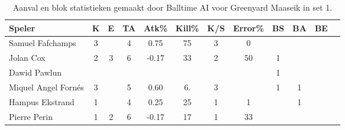 \begin{table}[ht!]
  \centering
  \scriptsize
  \begin{tabular}{|l|c|c|c|c|c|c|c|c|c|c|c|} \hline
    \textbf{Speler} & K & E & TA & Atk\% & Kill\% & K/S & Error\% & BS & BA & BE \\ \hline
    Samuel Fafchamps & 3 &  & 4 & 0.75 & 75 & 3 & 0 &  &  & \\
    Jolan Cox & 2 & 3 & 6 & -0.17 & 33 & 2 & 50 & 1 &  &  \\
    Dawid Pawlun &   &   &   &   &   &   &   & 1 &  &   \\
    Miquel Angel Fornés & 3 &  & 5 & 0.60 & 6. & 3 &  & 1 & 1 & \\
    Hampus Ekstrand & 1 &  & 4 & 0.25 & 25 & 1 & 1 &  & 1 & \\
    Pierre Perin & 1 & 2 & 6 & -0.17 & 17 & 1 & 33 &  &   &  \\ \hline
    \end{tabular}
  \caption[Aanval en blok statistieken gemaakt door Balltime AI voor Greenyard Maaseik in set 1]{\label{tab:PL1AttBlockMaaseik1}Aanval en blok statistieken gemaakt door Balltime AI voor Greenyard Maaseik in set 1.}
\end{table}

